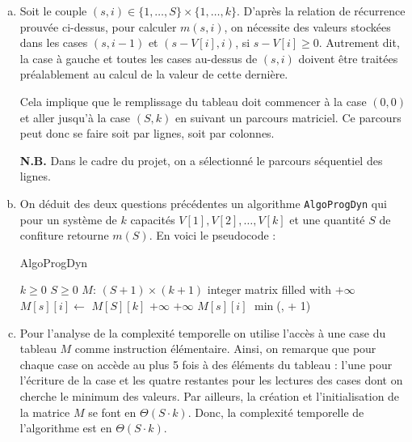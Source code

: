 \documentclass[12pt,a4paper]{article}
\begin{document}
\begin{enumerate}[a)]
 \item Soit le couple $(s,i) \in \{1,\dotsc,S\} \times \{1,\dotsc,k\}$. D'apr\`es la relation de r\'ecurrence prouv\'ee ci-dessus, pour calculer $m(s,i)$, on n\'ecessite des valeurs stock\'ees dans les cases $(s,i-1)$ et $(s-V[i],i)$, si $s-V[i] \geq 0$. Autrement dit, la case \`a gauche et toutes les cases au-dessus de $(s,i)$ doivent \^etre trait\'ees pr\'ealablement au calcul de la valeur de cette derni\`ere.
 
 Cela implique que le remplissage du tableau doit commencer \`a la case $(0,0)$ et aller jusqu'\`a la case $(S,k)$ en suivant un parcours matriciel. Ce parcours peut donc se faire soit par lignes, soit par colonnes. 
 
 {\bfseries N.B.} Dans le cadre du projet, on a s\'electionn\'e le parcours s\'equentiel des lignes.
 
 \item On d\'eduit des deux questions pr\'ec\'edentes un algorithme \texttt{AlgoProgDyn} qui pour un syst\`eme de $k$ capacit\'es $V[1],V[2],\dotsc,V[k]$ et une quantit\'e $S$ de confiture retourne $m(S)$. En voici le pseudocode :
 
\begin{algorithm}
\caption{AlgoProgDyn}
\begin{algorithmic}[1]
\Require $k \geq 0$ \AND $S \geq 0$
    \State $M$: $(S+1) \times (k+1)$ integer matrix filled with $+\infty$
            \State $M[s][i] \gets $ 
        \EndFor
    \EndFor
    \State \Return $M[S][k]$
\EndFunction
\Statex
{}
        \State {}
        \State \Return $+\infty$
        \State \Return $+\infty$
    	\State \Return $M[s][i]$
    \Else 
        \State \Return $\min$(,  + 1)
    \EndIf
\EndFunction
\end{algorithmic}
\end{algorithm}

 \item Pour l'analyse de la complexit\'e temporelle on utilise l'acc\`es \`a une case du tableau $M$ comme instruction \'el\'ementaire. Ainsi, on remarque que pour chaque case on acc\`ede au plus 5 fois \`a des \'el\'ements du tableau : l'une pour l'\'ecriture de la case et les quatre restantes pour les lectures des cases dont on cherche le minimum des valeurs. Par ailleurs, la cr\'eation et l'initialisation de la matrice $M$ se font en $\Theta(S\cdot k)$.
Donc, la complexit\'e temporelle de l'algorithme est en $\Theta(S\cdot k)$.


\end{enumerate}
\end{document}
